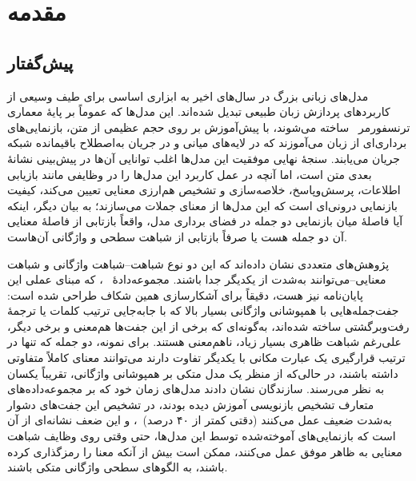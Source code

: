 
\chapter{مقدمه}
\label{ch:intro}

\section{پیش‌گفتار}
مدل‌های زبانی
بزرگ در سال‌های اخیر به ابزاری اساسی برای طیف وسیعی از کاربردهای پردازش زبان طبیعی
تبدیل شده‌اند. این مدل‌ها که عموماً بر پایهٔ معماری ترنسفورمر~\cite{vaswani2017attention}
ساخته می‌شوند، با پیش‌آموزش
بر روی حجم عظیمی از متن، بازنمایی‌های
برداری‌ای از زبان می‌آموزند که در لایه‌های میانی و در جریان به‌اصطلاح باقیمانده
شبکه جریان می‌یابند. سنجهٔ نهایی موفقیت این مدل‌ها اغلب توانایی آن‌ها در پیش‌بینی نشانهٔ
بعدی متن است، اما آنچه در عمل کاربرد این مدل‌ها را در وظایفی مانند بازیابی اطلاعات، پرسش‌وپاسخ، خلاصه‌سازی و تشخیص هم‌ارزی معنایی
تعیین می‌کند، کیفیت بازنمایی درونی‌ای است که این مدل‌ها از معنای جملات می‌سازند؛ به بیان دیگر، اینکه آیا فاصلهٔ میان بازنمایی دو جمله در فضای برداری مدل، واقعاً بازتابی از فاصلهٔ معنایی آن دو جمله هست یا صرفاً بازتابی از شباهت سطحی و واژگانی آن‌هاست.

پژوهش‌های متعددی نشان داده‌اند که این دو نوع شباهت--شباهت واژگانی و شباهت معنایی--می‌توانند به‌شدت از یکدیگر جدا باشند. مجموعه‌دادهٔ
~\cite{zhang2019paws}،
که مبنای عملی این پایان‌نامه نیز هست، دقیقاً برای آشکارسازی همین شکاف طراحی شده است: جفت‌جمله‌هایی با همپوشانی واژگانی بسیار بالا که با جابه‌جایی ترتیب کلمات یا ترجمهٔ رفت‌وبرگشتی
ساخته شده‌اند، به‌گونه‌ای که برخی از این جفت‌ها هم‌معنی
و برخی دیگر، على‌رغم شباهت ظاهری بسیار زیاد، ناهم‌معنی هستند. برای نمونه، دو جمله که تنها در ترتیب قرارگیری یک عبارت مکانی با یکدیگر تفاوت دارند می‌توانند معنای کاملاً متفاوتی داشته باشند، در حالی‌که از منظر یک مدل متکی بر همپوشانی واژگانی، تقریباً یکسان به نظر می‌رسند. سازندگان
نشان دادند مدل‌های زمان خود که بر مجموعه‌داده‌های متعارف تشخیص بازنویسی
آموزش دیده بودند، در تشخیص این جفت‌های دشوار به‌شدت ضعیف عمل می‌کنند (دقتی کمتر از ۴۰ درصد)~\cite{zhang2019paws}، و این ضعف نشانه‌ای از آن است که بازنمایی‌های آموخته‌شده توسط این مدل‌ها، حتی وقتی روی وظایف شباهت معنایی به ظاهر موفق عمل می‌کنند، ممکن است بیش از آنکه معنا را رمزگذاری کرده باشند، به الگوهای سطحی واژگانی متکی باشند.

